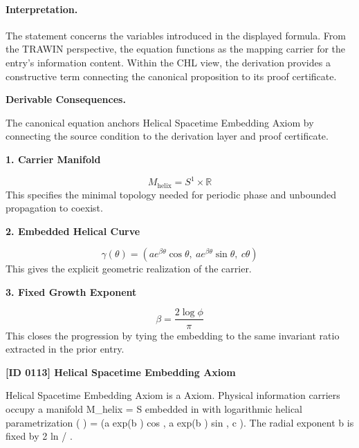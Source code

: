 \paragraph{Interpretation.}
The statement concerns the variables introduced in the displayed formula. From the TRAWIN perspective, the equation functions as the mapping carrier for the entry’s information content. Within the CHL view, the derivation provides a constructive term connecting the canonical proposition to its proof certificate.

\par\vspace{0.35em}
\noindent\textbf{Derivable Consequences.}\quad
\begingroup
\footnotesize
\raggedright
The canonical equation anchors Helical Spacetime Embedding Axiom by connecting the source condition to the derivation layer and proof certificate.
\par\endgroup

\noindent\textbf{1. Carrier Manifold}\par
\[
M_{\mathrm{helix}} = S^1 \times \mathbb{R}
\]
\noindent This specifies the minimal topology needed for periodic phase and unbounded propagation to coexist.\par
\noindent\textbf{2. Embedded Helical Curve}\par
\[
\gamma(\theta)=
\left(
a e^{\beta \theta}\cos\theta,\ 
a e^{\beta \theta}\sin\theta,\ 
c\theta
\right)
\]
\noindent This gives the explicit geometric realization of the carrier.\par
\noindent\textbf{3. Fixed Growth Exponent}\par
\[
\beta = \frac{2\log \phi}{\pi}
\]
\noindent This closes the progression by tying the embedding to the same invariant ratio extracted in the prior entry.\par

\clearpage
\noindent\textbf{[ID 0113] Helical Spacetime Embedding Axiom}\par
\vspace{0.35em}
\tzpsection{Dictionary}
\begingroup\small
{}
Helical Spacetime Embedding Axiom is a Axiom. Physical information carriers occupy a manifold M\_helix = S      embedded in    with logarithmic helical parametrization  ( ) = (a exp(b  ) cos  , a exp(b  ) sin  , c  ). The radial exponent b is fixed by 2 ln  / .


